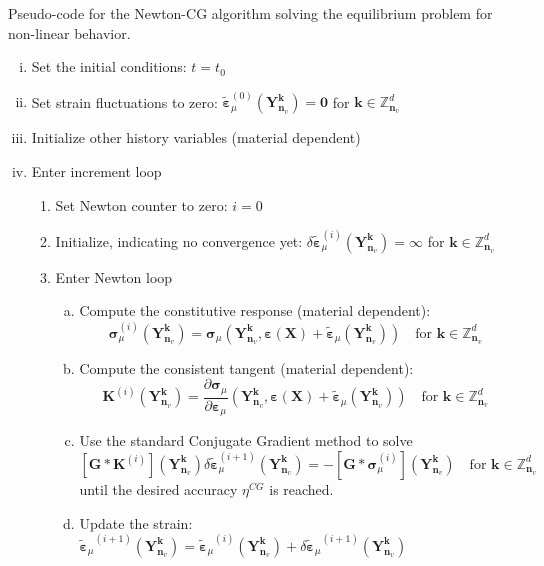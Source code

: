 \begin{framedbox}[htb]
\caption{Pseudo-code for the Newton-CG algorithm solving the equilibrium problem for non-linear behavior.}
\label{box:alg_newton_cg}
\begin{center}
\begin{minipage}{0.9\textwidth}
\begin{enumerate}[(i)]
\item Set the initial conditions: \(t=t_0\)
\item Set strain fluctuations to zero: \(\tilde{\bm \varepsilon}_\mu^{(0)}(\bm Y^{\bm k}_{\bm n_v})=\bm{0}\) for \(\bm  k \in \mathbb{Z}_{\bm n_v}^{d}\)
\item Initialize other history variables (material dependent)
\item Enter increment loop
\begin{enumerate}[(1)]
  \item Set Newton counter to zero: \(i=0\)
  \item Initialize, indicating no convergence yet: \(\delta \tilde{\bm\varepsilon}_\mu^{(i)}(\bm Y^{\bm k}_{\bm n_v})={\bm \infty}\) for \(\bm  k \in \mathbb{Z}_{\bm n_v}^{d}\)
  \item Enter Newton loop
  \begin{enumerate}[(a)]
    \item Compute the constitutive response (material dependent): \[\bm{\sigma}_\mu^{(i)}(\bm Y^{\bm k}_{\bm n_v})={\bm{\sigma}_\mu}\left(\bm{Y}_{\bm n_v}^{\bm  k}, \bm \varepsilon(\bm X)+\tilde{\bm \varepsilon}_\mu \left(\bm Y_{\bm n_v}^{\bm  k}\right)\right)\quad\text{for \(\bm  k \in \mathbb{Z}_{\bm n_v}^{d}\)}\]
    \item Compute the consistent tangent (material dependent):
    \[{\bm{K}}^{(i)}(\bm Y^{\bm k}_{\bm n_v})=\frac{\partial \bm{\sigma}_\mu}{\partial \bm\varepsilon_\mu}\left(\bm{Y}_{\bm n_v}^{\bm  k}, \bm \varepsilon(\bm X)+\tilde{\bm \varepsilon}_\mu \left(\bm Y_{\bm n_v}^{\bm  k}\right)\right)\quad\text{for \(\bm  k \in \mathbb{Z}_{\bm n_v}^{d}\)}\]
    \item Use the standard Conjugate Gradient method to solve
    \[
[\bm G * \bm K^{(i)}]\left(\bm{Y}_{\bm n_v}^{\bm  k}\right)\delta \tilde{\bm\varepsilon}_{\mu}^{(i+1)}\left(\bm{Y}_{\bm n_v}^{\bm  k}\right) = -[\bm G * \bm\sigma_\mu^{(i)}]\left(\bm{Y}_{\bm n_v}^{\bm  k}\right)\quad \text{for \(\bm k \in \mathbb Z^d_{\bm n_v}\)}
\]
until the desired accuracy \(\eta^{CG}\) is reached.
  \item Update the strain: \({\tilde{\bm\varepsilon}_\mu}^{(i+1)}\left(\bm{Y}_{\bm n_v}^{\bm  k}\right)={\tilde{\bm\varepsilon}_\mu}^{(i)}\left(\bm{Y}_{\bm n_v}^{\bm  k}\right)+\delta {\tilde{\bm\varepsilon}_\mu}^{(i+1)}\left(\bm{Y}_{\bm n_v}^{\bm  k}\right)\)

\end{enumerate}
\end{enumerate}
\end{enumerate}
\end{minipage}
\end{center}
\end{framedbox}
